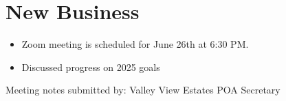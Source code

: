 \documentclass[12pt,a4paper]{article}
\begin{document}
\section*{New Business}
\begin{itemize}
  \item Zoom meeting is scheduled for June 26th at 6:30 PM.
  \item Discussed progress on 2025 goals
\end{itemize}

\begin{flushleft}
Meeting notes submitted by:\break{}
\@author\break{}
Valley View Estates POA Secretary
\end{flushleft}
\end{document}

